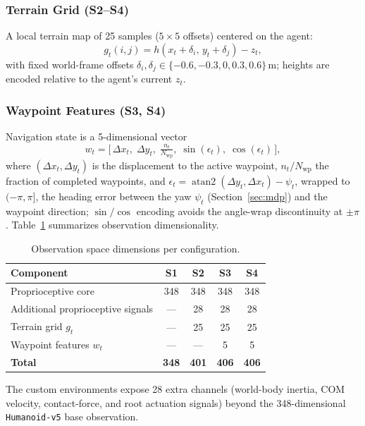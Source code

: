 \documentclass[conference,a4paper]{IEEEtran}
\begin{document}
\subsubsection{Terrain Grid (S2--S4)} A local terrain map of 25 samples ($5 \times 5$ offsets) centered on the agent:
\begin{equation}
\label{eq:terrain_grid}
g_t(i,j) = h(x_t + \delta_i,\, y_t + \delta_j) - z_t,
\end{equation}
with fixed world-frame offsets $\delta_i, \delta_j \in \{-0.6, -0.3, 0, 0.3, 0.6\}$\,m; heights are encoded relative to the agent's current $z_t$.

\subsubsection{Waypoint Features (S3, S4)} Navigation state is a 5-dimensional vector
\begin{equation}
\label{eq:waypoint_signal}
w_t = \Big[\,\Delta x_t,\;\Delta y_t,\;\tfrac{n_t}{N_{\mathrm{wp}}},\;\sin(\epsilon_t),\;\cos(\epsilon_t)\,\Big],
\end{equation}
where $(\Delta x_t, \Delta y_t)$ is the displacement to the active waypoint, $n_t/N_{\mathrm{wp}}$ the fraction of completed waypoints, and $\epsilon_t = \operatorname{atan2}(\Delta y_t, \Delta x_t) - \psi_t$, wrapped to $(-\pi, \pi]$, the heading error between the yaw $\psi_t$ (Section~\ref{sec:mdp}) and the waypoint direction; $\sin/\cos$ encoding avoids the angle-wrap discontinuity at $\pm\pi$. Table~\ref{tab:obs_dims} summarizes observation dimensionality.

\begin{table}[t]
\caption{Observation space dimensions per configuration.}
\label{tab:obs_dims}
\centering
\small
\begin{tabular}{@{}lcccc@{}}
\toprule
\textbf{Component} & \textbf{S1} & \textbf{S2} & \textbf{S3} & \textbf{S4} \\
\midrule
Proprioceptive core & 348 & 348 & 348 & 348 \\
Additional proprioceptive signals & --- & 28 & 28 & 28 \\
Terrain grid $g_t$ & --- & 25 & 25 & 25 \\
Waypoint features $w_t$ & --- & --- & 5 & 5 \\
\midrule
\textbf{Total} & \textbf{348} & \textbf{401} & \textbf{406} & \textbf{406} \\
\bottomrule
\end{tabular}

\vspace{2pt}
{\raggedright\footnotesize The custom environments expose 28 extra channels (world-body inertia, COM velocity, contact-force, and root actuation signals) beyond the 348-dimensional \texttt{Humanoid-v5} base observation.\par}
\end{table}
\end{document}
